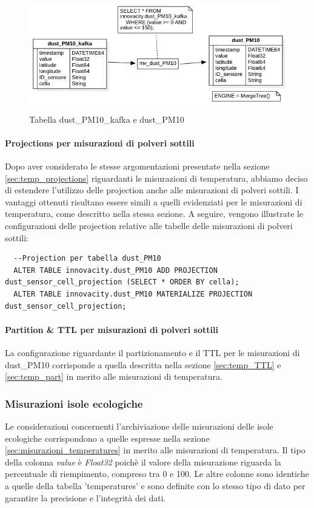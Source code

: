 \begin{figure}[H]
    \centering
    \includegraphics[width=1\textwidth]{../Images/SpecificaTecnica/dust_PM10.png}
    \caption{Tabella dust\_PM10\_kafka e dust\_PM10}
    \label{fig:dust_table}
\end{figure}

\paragraph{Projections per misurazioni di polveri sottili} 
Dopo aver considerato le stesse argomentazioni presentate nella sezione \ref{sec:temp_projections} riguardanti le misurazioni di temperatura, abbiamo deciso di estendere l'utilizzo delle projection anche alle misurazioni di polveri sottili. I vantaggi ottenuti risultano essere simili a quelli evidenziati per le misurazioni di temperatura, come descritto nella stessa sezione. A seguire, vengono illustrate le configurazioni delle projection relative alle tabelle delle misurazioni di polveri sottili:

\begin{lstlisting}
  --Projection per tabella dust_PM10
  ALTER TABLE innovacity.dust_PM10 ADD PROJECTION dust_sensor_cell_projection (SELECT * ORDER BY cella);
  ALTER TABLE innovacity.dust_PM10 MATERIALIZE PROJECTION dust_sensor_cell_projection;
\end{lstlisting}

\paragraph{Partition \& TTL per misurazioni di polveri sottili}
La configurazione riguardante il partizionamento e il TTL per le misurazioni di dust\_PM10 corrisponde a quella descritta nella sezione \ref{sec:temp_TTL} e \ref{sec:temp_part} in merito alle misurazioni di temperatura.
\subsubsection{Misurazioni isole ecologiche}
Le considerazioni concernenti l'archiviazione delle misurazioni delle isole ecologiche corrispondono a quelle espresse nella sezione \ref{sec:misurazioni_temperatures} in merito alle misurazioni di temperatura. Il tipo della colonna \textit{value} è \textit{Float32} poichè il valore della misurazione riguarda la percentuale di riempimento, compreso tra 0 e 100. Le altre colonne sono identiche a quelle della tabella 'temperatures' e sono definite con lo stesso tipo di dato per garantire la precisione e l'integrità dei dati.

